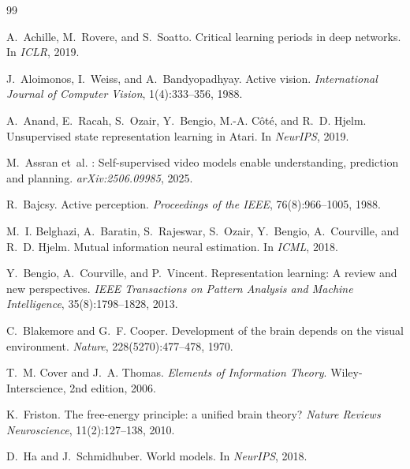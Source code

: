 \documentclass{article}
\begin{document}
\begin{thebibliography}{99}

A.~Achille, M.~Rovere, and S.~Soatto.
\newblock Critical learning periods in deep networks.
\newblock In \emph{ICLR}, 2019.

J.~Aloimonos, I.~Weiss, and A.~Bandyopadhyay.
\newblock Active vision.
\newblock \emph{International Journal of Computer Vision}, 1(4):333--356, 1988.

A.~Anand, E.~Racah, S.~Ozair, Y.~Bengio, M.-A. C\^ot\'e, and R.~D. Hjelm.
\newblock Unsupervised state representation learning in {Atari}.
\newblock In \emph{NeurIPS}, 2019.

M.~Assran et~al.
: Self-supervised video models enable understanding,
prediction and planning.
\newblock \emph{arXiv:2506.09985}, 2025.

R.~Bajcsy.
\newblock Active perception.
\newblock \emph{Proceedings of the IEEE}, 76(8):966--1005, 1988.

M.~I. Belghazi, A.~Baratin, S.~Rajeswar, S.~Ozair, Y.~Bengio, A.~Courville, and
  R.~D. Hjelm.
\newblock Mutual information neural estimation.
\newblock In \emph{ICML}, 2018.

Y.~Bengio, A.~Courville, and P.~Vincent.
\newblock Representation learning: A review and new perspectives.
\newblock \emph{IEEE Transactions on Pattern Analysis and Machine Intelligence},
  35(8):1798--1828, 2013.

C.~Blakemore and G.~F. Cooper.
\newblock Development of the brain depends on the visual environment.
\newblock \emph{Nature}, 228(5270):477--478, 1970.

T.~M. Cover and J.~A. Thomas.
\newblock \emph{Elements of Information Theory}.
\newblock Wiley-Interscience, 2nd edition, 2006.

K.~Friston.
\newblock The free-energy principle: a unified brain theory?
\newblock \emph{Nature Reviews Neuroscience}, 11(2):127--138, 2010.

D.~Ha and J.~Schmidhuber.
\newblock World models.
\newblock In \emph{NeurIPS}, 2018.


\end{thebibliography}
\end{document}
